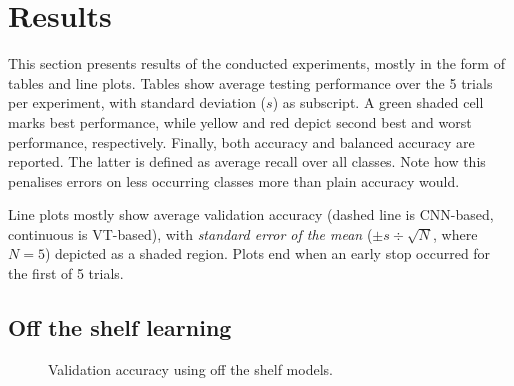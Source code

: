 \section{Results}

This section presents results of the conducted experiments, mostly in the form of tables and line plots. Tables show average testing performance over the 5 trials per experiment, with standard deviation ($s$) as subscript. A green shaded cell marks best performance, while yellow and red depict second best and worst performance, respectively. Finally, both accuracy and balanced accuracy are reported. The latter is defined as average recall over all classes. Note how this penalises errors on less occurring classes more than plain accuracy would.

Line plots mostly show average validation accuracy (dashed line is CNN-based, continuous is VT-based), with \textit{standard error of the mean} ($\pm s \div \sqrt{N}$, where $N=5$) depicted as a shaded region. Plots end when an early stop occurred for the first of 5 trials.



\subsection{Off the shelf learning} \label{results:ots}

\begin{figure}[tb]
    \centering
    \def\svgwidth{\textwidth}
    
    \caption{Validation accuracy using off the shelf models.}
    \label{results:img:ots}
\end{figure}

